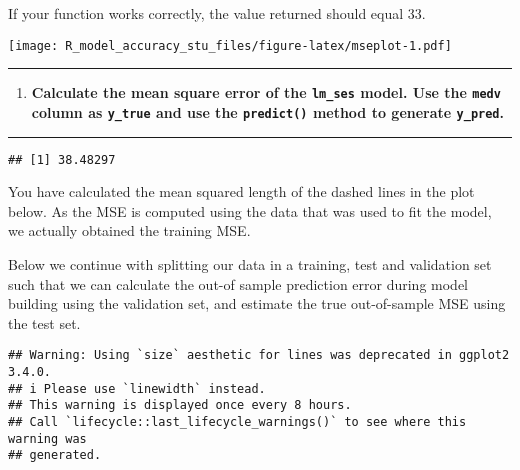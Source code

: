 \documentclass[
  12pt,
]{article}
\newenvironment{Shaded}{\begin{snugshade}}{\end{snugshade}}
\newcommand{\AttributeTok}[1]{\textcolor[rgb]{0.13,0.29,0.53}{#1}}
\newcommand{\FunctionTok}[1]{\textcolor[rgb]{0.13,0.29,0.53}{\textbf{#1}}}
\newcommand{\NormalTok}[1]{#1}
\newcommand{\OtherTok}[1]{\textcolor[rgb]{0.56,0.35,0.01}{#1}}
\newcommand{\SpecialCharTok}[1]{\textcolor[rgb]{0.81,0.36,0.00}{\textbf{#1}}}
\providecommand{\tightlist}{%
  \setlength{\itemsep}{0pt}\setlength{\parskip}{0pt}}
\begin{document}
If your function works correctly, the value returned should equal 33.

\texttt{[image: R\_model\_accuracy\_stu\_files/figure-latex/mseplot-1.pdf]}

\begin{center}\rule{0.5\linewidth}{0.5pt}\end{center}

\begin{enumerate}
\def\labelenumi{\arabic{enumi}.}
\setcounter{enumi}{10}
\tightlist
\item
  \textbf{Calculate the mean square error of the \texttt{lm\_ses} model.
  Use the \texttt{medv} column as \texttt{y\_true} and use the
  \texttt{predict()} method to generate \texttt{y\_pred}.}
\end{enumerate}

\begin{center}\rule{0.5\linewidth}{0.5pt}\end{center}

\begin{Shaded}
\end{Shaded}

\begin{verbatim}
## [1] 38.48297
\end{verbatim}

You have calculated the mean squared length of the dashed lines in the
plot below. As the MSE is computed using the data that was used to fit
the model, we actually obtained the training MSE.

Below we continue with splitting our data in a training, test and
validation set such that we can calculate the out-of sample prediction
error during model building using the validation set, and estimate the
true out-of-sample MSE using the test set.

\begin{verbatim}
## Warning: Using `size` aesthetic for lines was deprecated in ggplot2 3.4.0.
## i Please use `linewidth` instead.
## This warning is displayed once every 8 hours.
## Call `lifecycle::last_lifecycle_warnings()` to see where this warning was
## generated.
\end{verbatim}
\end{document}
